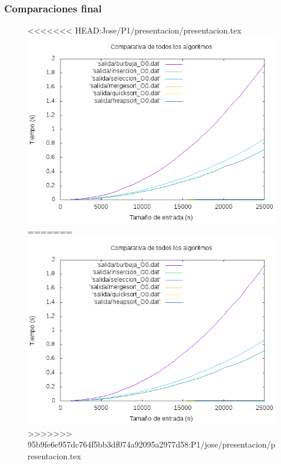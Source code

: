 \documentclass[spanish]{beamer}
\begin{document}
  
\begin{frame}\frametitle{Comparaciones final}
  \begin{figure}[H]
    \centering   
<<<<<<< HEAD:Jose/P1/presentacion/presentacion.tex
        \includegraphics[clip,width=1\columnwidth]{../plots/todos_ordenacion_O0.png}%
=======
        \includegraphics[clip,width=0.8\columnwidth]{../plots/todos_ordenacion_O0.png}%
>>>>>>> 95b9fe6e957dc764f5bb3df074a92095a2977d58:P1/jose/presentacion/presentacion.tex
      \end{figure}
  \end{frame}
\end{document}
